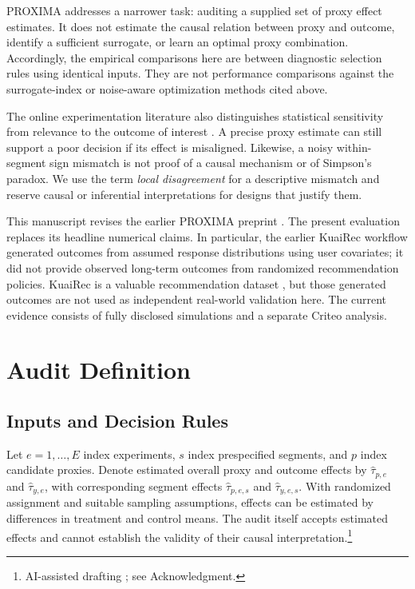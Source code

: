 \documentclass{ieeeaccess}
\begin{document}
PROXIMA addresses a narrower task: auditing a supplied set of proxy effect estimates. It does not estimate the causal relation between proxy and outcome, identify a sufficient surrogate, or learn an optimal proxy combination. Accordingly, the empirical comparisons here are between diagnostic selection rules using identical inputs. They are not performance comparisons against the surrogate-index or noise-aware optimization methods cited above.

The online experimentation literature also distinguishes statistical sensitivity from relevance to the outcome of interest \cite{larsen}. A precise proxy estimate can still support a poor decision if its effect is misaligned. Likewise, a noisy within-segment sign mismatch is not proof of a causal mechanism or of Simpson's paradox. We use the term \emph{local disagreement} for a descriptive mismatch and reserve causal or inferential interpretations for designs that justify them.

This manuscript revises the earlier PROXIMA preprint \cite{preprint}. The present evaluation replaces its headline numerical claims. In particular, the earlier KuaiRec workflow generated outcomes from assumed response distributions using user covariates; it did not provide observed long-term outcomes from randomized recommendation policies. KuaiRec is a valuable recommendation dataset \cite{kuairec}, but those generated outcomes are not used as independent real-world validation here. The current evidence consists of fully disclosed simulations and a separate Criteo analysis.

\section{Audit Definition}
\subsection{Inputs and Decision Rules}
Let $e=1,\ldots,E$ index experiments, $s$ index prespecified segments, and $p$ index candidate proxies. Denote estimated overall proxy and outcome effects by $\widehat\tau_{p,e}$ and $\widehat\tau_{y,e}$, with corresponding segment effects $\widehat\tau_{p,e,s}$ and $\widehat\tau_{y,e,s}$. With randomized assignment and suitable sampling assumptions, effects can be estimated by differences in treatment and control means. The audit itself accepts estimated effects and cannot establish the validity of their causal interpretation.\footnote{AI-assisted drafting \cite{codex}; see Acknowledgment.}
\end{document}
